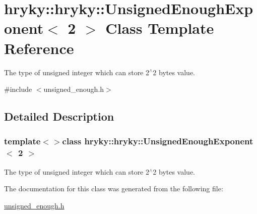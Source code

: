 \hypertarget{classhryky_1_1hryky_1_1_unsigned_enough_exponent_3_012_01_4}{\section{hryky\-:\-:hryky\-:\-:Unsigned\-Enough\-Exponent$<$ 2 $>$ Class Template Reference}
\label{classhryky_1_1hryky_1_1_unsigned_enough_exponent_3_012_01_4}
}


The type of unsigned integer which can store 2$^\wedge$2 bytes value.  




{\ttfamily \#include $<$unsigned\-\_\-enough.\-h$>$}



\subsection{Detailed Description}
\subsubsection*{template$<$$>$class hryky\-::hryky\-::\-Unsigned\-Enough\-Exponent$<$ 2 $>$}

The type of unsigned integer which can store 2$^\wedge$2 bytes value. 

The documentation for this class was generated from the following file\-:\begin{DoxyCompactItemize}
\item 
\hyperlink{unsigned__enough_8h}{unsigned\-\_\-enough.\-h}\end{DoxyCompactItemize}
